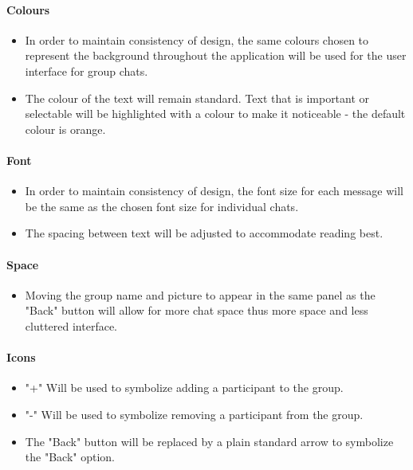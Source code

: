 \documentclass[11pt]{article}
\begin{document}
\paragraph{Colours}
\begin{itemize}
\item	In order to maintain consistency of design, the same colours chosen to represent the background throughout the application will be used for the user interface for group chats.
\item	The colour of the text will remain standard. Text that is important or selectable will be highlighted with a colour to make it noticeable - the default colour is orange. 	\\
\end{itemize}

\paragraph{Font}
\begin{itemize}
\item	In order to maintain consistency of design, the font size for each message will be the same as the chosen font size for individual chats.
\item The spacing between text will be adjusted to accommodate reading best.\\
\end{itemize}

\paragraph{Space}
\begin{itemize}
\item	Moving the group name and picture to appear in the same panel as the "Back" button will allow for more chat space thus more space and less cluttered interface.
\end{itemize}

\paragraph{Icons}
\begin{itemize}
\item	"+" Will be used to symbolize adding a participant to the group.  
\item "-" Will be used to symbolize removing a participant from the group.
\item The "Back" button will be replaced by a plain standard arrow to symbolize the "Back" option.  
\end{itemize}
\end{document}
